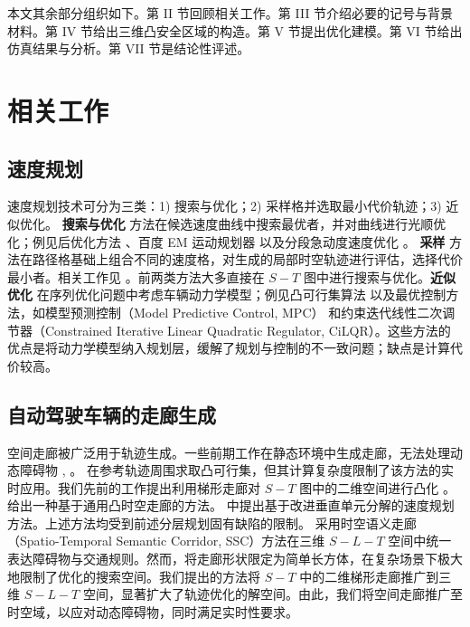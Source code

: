 \documentclass[UTF8,a4paper,12pt,fontset=none]{ctexart}
\theoremstyle{definition}
\theoremstyle{plain}
\theoremstyle{plain}
\theoremstyle{plain}
\begin{document}
本文其余部分组织如下。第 II 节回顾相关工作。第 III 节介绍必要的记号与背景材料。第 IV 节给出三维凸安全区域的构造。第 V 节提出优化建模。第 VI 节给出仿真结果与分析。第 VII 节是结论性评述。

\section{相关工作}

\subsection{速度规划}
速度规划技术可分为三类：1) 搜索与优化；2) 采样格并选取最小代价轨迹；3) 近似优化。
\textbf{搜索与优化} 方法在候选速度曲线中搜索最优者，并对曲线进行光顺优化；例见后优化方法 \cite{wenda_xu_real-time_2012}、百度 EM 运动规划器 \cite{fan_baidu_2018} 以及分段急动度速度优化 \cite{zhou_autonomous_2021}。
\textbf{采样} 方法在路径格基础上组合不同的速度格，对生成的局部时空轨迹进行评估，选择代价最小者。相关工作见 \cite{gu_runtime-bounded_2016,wenda_xu_real-time_2012,li_real-time_2016}。前两类方法大多直接在 $S-T$ 图中进行搜索与优化。\textbf{近似优化} 在序列优化问题中考虑车辆动力学模型；例见凸可行集算法 \cite{liu_speed_2017} 以及最优控制方法，如模型预测控制（Model Predictive Control, MPC）\cite{qian_motion_2016} 和约束迭代线性二次调节器（Constrained Iterative Linear Quadratic Regulator, CiLQR）\cite{pan_safe_2020}。这些方法的优点是将动力学模型纳入规划层，缓解了规划与控制的不一致问题；缺点是计算代价较高。

\subsection{自动驾驶车辆的走廊生成}
空间走廊被广泛用于轨迹生成。一些前期工作在静态环境中生成走廊，无法处理动态障碍物 \cite{zhu_convex_2015}, \cite{erlien_safe_2013}。
\citet{liu_convex_2018} 在参考轨迹周围求取凸可行集，但其计算复杂度限制了该方法的实时应用。我们先前的工作提出利用梯形走廊对 $S-T$ 图中的二维空间进行凸化 \cite{li_motion_nodate}。\citet{zhang_sufficient_2022} 给出一种基于通用凸时空走廊的方法。\citet{xu_speed_nodate} 中提出基于改进垂直单元分解的速度规划方法。上述方法均受到前述分层规划固有缺陷的限制。\citet{ding_safe_2019} 采用时空语义走廊（Spatio-Temporal Semantic Corridor, SSC）方法在三维 $S-L-T$ 空间中统一表达障碍物与交通规则。然而，将走廊形状限定为简单长方体，在复杂场景下极大地限制了优化的搜索空间。我们提出的方法将 $S-T$ 中的二维梯形走廊推广到三维 $S-L-T$ 空间，显著扩大了轨迹优化的解空间。由此，我们将空间走廊推广至时空域，以应对动态障碍物，同时满足实时性要求。
\end{document}
